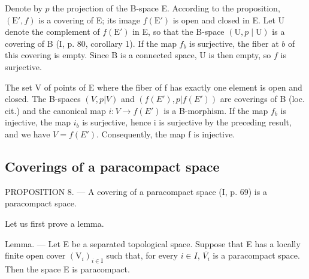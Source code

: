 Denote by \(p\) the projection of the B-space E. According to the proposition, \((\mathrm{E}', f)\) is a covering of E; its image \(f(\mathrm{E}')\) is open and closed in E. Let U denote the complement of \(f(\mathrm{E}')\) in E, so that the B-space \((\mathrm{U}, p \mid \mathrm{U})\) is a covering of B (I, p. 80, corollary 1). If the map \(f_b\) is surjective, the fiber at \(b\) of this covering is empty. Since B is a connected space, U is then empty, so \(f\) is surjective.

The set V of points of E where the fiber of f has exactly one element is open and closed. The B-spaces \((V, p|V)\) and \((f(E'), p|f(E'))\) are coverings of B (loc. cit.) and the canonical map \(i: V \to f(E')\) is a B-morphism. If the map \(f_b\) is injective, the map \(i_b\) is surjective, hence i is surjective by the preceding result, and we have \(V = f(E')\). Consequently, the map f is injective.

\subsection{Coverings of a paracompact space}

PROPOSITION 8. --- A covering of a paracompact space (I, p. 69) is a paracompact space.

Let us first prove a lemma.

Lemma. --- Let E be a separated topological space. Suppose that E has a locally finite open cover \((\mathrm{V}_{i})_{i\in\mathrm{I}}\) such that, for every \(i\in I\), \(\overline{V_{i}}\) is a paracompact space. Then the space E is paracompact.

